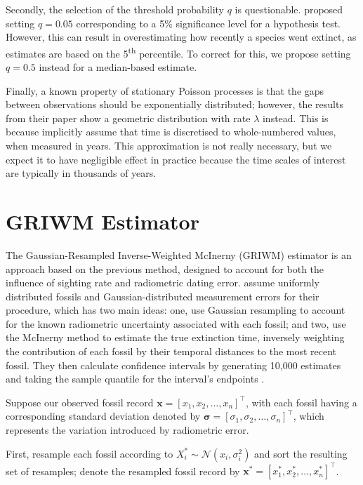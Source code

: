 Secondly, the selection of the threshold probability $q$ is questionable. \citet{Mcinerny2006} proposed setting $q = 0.05$ corresponding to a 5\% significance level for a hypothesis test. However, this can result in overestimating how recently a species went extinct, as estimates are based on the 5\textsuperscript{th} percentile. To correct for this, we propose setting $q = 0.5$ instead for a median-based estimate.

Finally, a known property of stationary Poisson processes is that the gaps between observations should be exponentially distributed; however, the results from their paper show a geometric distribution with rate $\lambda$ instead. This is because \citet{Mcinerny2006} implicitly assume that time is discretised to whole-numbered values, when measured in years. This approximation is not really necessary, but we expect it to have negligible effect in practice because the time scales of interest are typically in thousands of years.

\section{GRIWM Estimator}

The Gaussian-Resampled Inverse-Weighted McInerny (GRIWM) estimator is an approach based on the previous \citet{Mcinerny2006} method, designed to account for both the influence of sighting rate and radiometric dating error. \citet{Bradshaw2012} assume uniformly distributed fossils and Gaussian-distributed measurement errors for their procedure, which has two main ideas: one, use Gaussian resampling to account for the known radiometric uncertainty associated with each fossil; and two, use the McInerny method to estimate the true extinction time, inversely weighting the contribution of each fossil by their temporal distances to the most recent fossil. They then calculate confidence intervals by generating 10,000 estimates and taking the sample quantile for the interval's endpoints \cite{Bradshaw2012}.

Suppose our observed fossil record $\bm{x} = [x_1, x_2, \dots, x_n]^\top$, with each fossil having a corresponding standard deviation denoted by $\bm{\sigma}=[\sigma_1, \sigma_2, \dots, \sigma_n]^\top$, which represents the variation introduced by radiometric error.

First, resample each fossil according to $X^*_i \sim \mathcal{N}(x_i, \sigma_i^2)$ and sort the resulting set of resamples; denote the resampled fossil record by $\bm{x^*} = [x^*_1, x^*_2, \dots, x^*_n]^\top$.

